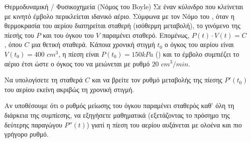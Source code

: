 \begin{problhma}{Θερμοδυναμική / Φυσικοχημεία (Νόμος του Boyle)}
Σε έναν κύλινδρο που κλείνεται με κινητό έμβολο περικλείεται ιδανικό αέριο. Σύμφωνα με τον Νόμο του , όταν η θερμοκρασία του αερίου διατηρείται σταθερή (ισόθερμη μεταβολή), το γινόμενο της πίεσής του $P$ και του όγκου του $V$ παραμένει σταθερό. Επομένως, $P(t) \cdot V(t) = C$, όπου $C$ μια θετική σταθερά. 
Κάποια χρονική στιγμή $t_0$ ο όγκος του αερίου είναι $V(t_0) = 400$ $\si{cm}^3$, η πίεση είναι $P(t_0) = 150 \si{kPa}$ () και το έμβολο συμπιέζει το αέριο έτσι ώστε ο όγκος του να μειώνεται με ρυθμό $20$ $\si{cm^3/min}$.
\begin{alist}
\item Να υπολογίσετε τη σταθερά $C$ και να βρείτε τον ρυθμό μεταβολής της πίεσης $P'(t_0)$ του αερίου εκείνη ακριβώς τη χρονική στιγμή.
\item Αν υποθέσουμε ότι ο ρυθμός μείωσης του όγκου παραμένει σταθερός καθ' όλη τη διάρκεια της συμπίεσης, να εξηγήσετε μαθηματικά (εξετάζοντας το πρόσημο της δεύτερης παραγώγου $P''(t)$) γιατί η πίεση του αερίου αυξάνεται με ολοένα και πιο γρήγορο ρυθμό.
\end{alist}

\begin{center}
\end{center}
\end{problhma}
